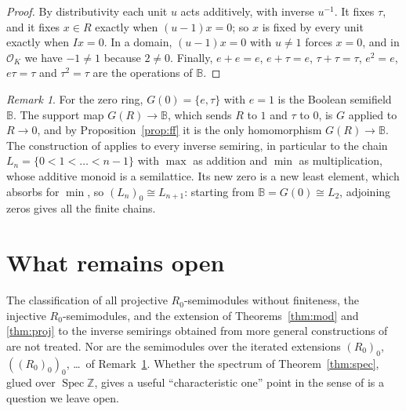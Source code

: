 \documentclass[11pt]{amsart}
\theoremstyle{remark}
\newtheorem{remark}[thm]{Remark}
\newcommand{\B}{\mathbb B}
\DeclareMathOperator{\Spec}{Spec}
\begin{document}
\begin{proof}
By distributivity each unit $u$ acts additively, with inverse $u^{-1}$. It fixes $\tau$, and it fixes $x\in R$ exactly when $(u-1)x=0$; so $x$ is fixed by every unit exactly when $Ix=0$. In a domain, $(u-1)x=0$ with $u\neq1$ forces $x=0$, and in $\mathcal O_K$ we have $-1\neq1$ because $2\neq0$. Finally, $e+e=e$, $e+\tau=e$, $\tau+\tau=\tau$, $e^2=e$, $e\tau=\tau$ and $\tau^2=\tau$ are the operations of $\B$.
\end{proof}

\begin{remark}\label{rem:chains}
For the zero ring, $G(0)=\{e,\tau\}$ with $e=1$ is the Boolean semifield $\B$. The support map $G(R)\to\B$, which sends $R$ to $1$ and $\tau$ to $0$, is $G$ applied to $R\to0$, and by Proposition~\ref{prop:ff} it is the only homomorphism $G(R)\to\B$. The construction of \cite[Definition 3.6]{FGJM} applies to every inverse semiring, in particular to the chain $L_n=\{0<1<\dots<n-1\}$ with $\max$ as addition and $\min$ as multiplication, whose additive monoid is a semilattice. Its new zero is a new least element, which absorbs for $\min$, so $(L_n)_0\cong L_{n+1}$: starting from $\B=G(0)\cong L_2$, adjoining zeros gives all the finite chains.
\end{remark}

\section{What remains open}
The classification of all projective $R_0$-semimodules without finiteness, the injective $R_0$-semimodules, and the extension of Theorems~\ref{thm:mod} and \ref{thm:proj} to the inverse semirings obtained from more general constructions of \cite[Construction 3.5]{FGJM} are not treated. Nor are the semimodules over the iterated extensions $(R_0)_0$, $((R_0)_0)_0$, \dots\ of Remark~\ref{rem:chains}. Whether the spectrum of Theorem~\ref{thm:spec}, glued over $\Spec\mathbb Z$, gives a useful ``characteristic one'' point in the sense of \cite{CC} is a question we leave open.
\end{document}

